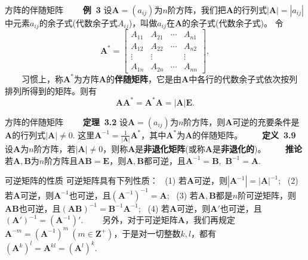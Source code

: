 \documentclass[compress,mathserif,cjk]{beamer}
\theoremstyle{remark}
\numberwithin{equation}{section}
\newcommand{\hei}{\bf}      %
\begin{document}
\begin{CJK}{UTF8}{gbsn}
\begin{frame}{方阵的伴随矩阵}
 \ \ \ \ {\hei 例~3} 设$\bm A=(a_{ij})$为$n$阶方阵，我们把$\bm A$的行列式$|\bm A|=|a_{ij}|$中元素$a_{ij}$的余子式(代数余子式$A_{ij}$)，叫做$a_{ij}$在$\bm A$的余子式(代数余子式)。
 \pause 令
 $$\bm A^*=\left[\begin{matrix}A_{11}&A_{21}&\cdots&A_{n1}\\A_{12}&A_{22}&\cdots&A_{n2}\\ \vdots&\vdots&&\vdots\\A_{1n}&A_{2n}&\cdots&A_{nn}\end{matrix}\right],$$
 \ \ \ \ 习惯上，称$\bm A^*$为方阵$\bm A$的{\hei 伴随矩阵}，它是由$\bm A$中各行的代数余子式依次按列排列所得到的矩阵。\pause 则有
 $$\bm A\bm A^*=\bm A^*\bm A=|\bm A|\bm E.$$


\end{frame}

\begin{frame}{方阵的伴随矩阵}
  \ \ \ \ {\hei 定理~3.2} 设$\bm A=(a_{ij})$为$n$阶方阵，则$\bm A$可逆的充要条件是$\bm A$的行列式$|\bm A|\neq0$. 这里$\bm A^{-1}=\frac{1}{|\bm A|}\bm A^*$，其中$\bm A^*$为$\bm A$的伴随矩阵。
  \pause\vskip 10pt
 \ \ \ \ {\hei 定义~3.9} 设$\bm A$为$n$阶方阵，若$|\bm A|\neq0$，则称$\bm A$是{\hei 非退化矩阵}(或称$\bm A$是{\hei 非退化的})。
 \pause\vskip 10pt
 \ \ \ \ {\hei 推论} 若$\bm A,\bm B$为$n$阶方阵且$\bm{AB}=\bm E$，则$\bm A,\bm B$都可逆，且$\bm A^{-1}=\bm B,$ $\bm B^{-1}=\bm A.$

 \end{frame}

\begin{frame}{可逆矩阵的性质}
 可逆矩阵具有下列性质：
 \pause\vskip 5pt
 \ (1) 若$\bm A$可逆，则$|\bm A^{-1}|=|\bm A|^{-1}$;
 \pause\vskip 5pt
 \ (2) 若$\bm A$可逆，则$\bm A^{-1}$也可逆，且$(\bm A^{-1})^{-1}=\bm A$;
 \pause\vskip 5pt
 \ (3) 若$\bm A,\bm B$都是$n$阶可逆矩阵，则$\bm A\bm B$也可逆，且$(\bm{AB})^{-1}=\bm B^{-1}\bm A^{-1}$;
 \pause\vskip 5pt
 \ (4) 若$\bm A$可逆，则$\bm A'$也可逆，且$(\bm A')^{-1}=(\bm A^{-1})'$.
 \pause\vskip 10pt
 \ \ \ \ 另外，对于可逆矩阵$\bm A$，我们再规定$\bm A^{-m}=(\bm A^{-1})^m~(m\in\bm Z^+)$，于是对一切整数$k,l$，都有
 $(\bm A^k)^l=\bm A^{kl}=(\bm A^l)^k.$
\end{frame}


\end{CJK}
\end{document}
